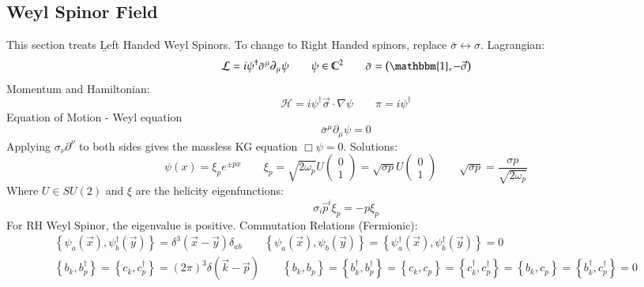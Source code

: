 \documentclass{article}
\newcommand{\C}{\ensuremath{\mathbb{C}}}
\begin{document}
\subsection{Weyl Spinor Field}
This section treats \b{Left Handed} Weyl Spinors. To change to Right Handed spinors, replace $\bar{\sigma} \leftrightarrow \sigma$.
\newline
Lagrangian:
\begin{equation*}
    \mathcal{L} = i\psi^\dagger \bar{\sigma}^\mu \partial_\mu \psi
    \qquad
    \psi \in \C^2
    \qquad
    \bar{\sigma} = \left(\mathbbm{1}, -\vec{\sigma}\right)
\end{equation*}
Momentum and Hamiltonian:
\begin{equation*}
    \mathcal{H} = i\psi^\dagger\vec{\sigma}\cdot\nabla\psi
    \qquad
    \pi = i \psi^\dagger
\end{equation*}
Equation of Motion - Weyl equation
\begin{equation*}
    \bar{\sigma}^\mu\partial_\mu \psi = 0
\end{equation*}
Applying $\sigma_\nu\partial^\nu$ to both sides gives the massless KG equation $\Box \psi = 0$.
\newline
Solutions:
\begin{equation*}
    \psi(x) = \xi_p e^{\pm px}
    \qquad
    \xi_p = \sqrt{2\omega_p} U\begin{pmatrix} 0 \\ 1 \end{pmatrix} = \sqrt{\sigma p} U\begin{pmatrix} 0 \\ 1 \end{pmatrix}
    \qquad
    \sqrt{\sigma p} = \frac{\sigma p}{\sqrt{2\omega_p}}
\end{equation*}
Where $U \in SU(2)$ and $\xi$ are the helicity eigenfunctions:
\begin{equation*}
    \sigma_i \hat{p}^i \xi_p = -p \xi_p
\end{equation*}
For RH Weyl Spinor, the eigenvalue is positive.
\newline 
Commutation Relations (Fermionic):
\begin{equation*}
\begin{gathered}
    \left\{\psi_a(\vec{x}), \psi_b^\dagger(\vec{y})\right\} = \delta^3(\vec{x} - \vec{y})\delta_{ab}
    \qquad
    \left\{\psi_a(\vec{x}), \psi_b(\vec{y})\right\} =
    \left\{\psi_a^\dagger(\vec{x}), \psi_b^\dagger(\vec{y})\right\} =
    0
    \\
    \left\{b_k, b_p^\dagger\right\} = \left\{c_k, c_p^\dagger\right\} = (2\pi)^3\delta(\vec{k} - \vec{p})
    \qquad
    \left\{b_k, b_p\right\} = \left\{b_k^\dagger, b_p^\dagger\right\} = \left\{c_k, c_p\right\} = \left\{c_k^\dagger, c_p^\dagger\right\} = \left\{b_k, c_p\right\} = \left\{b_k^\dagger, c_p^\dagger\right\} = 0
\end{gathered}
\end{equation*}
\end{document}
